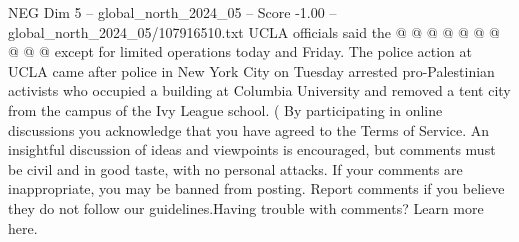 \begin{textsample}{NEG Dim 5 – global\_north\_2024\_05 – Score -1.00 – global\_north\_2024\_05/107916510.txt}
UCLA officials said the @ @ @ @ @ @ @ @ @ @ except for limited operations today and Friday.
The police action at UCLA came after police in New York City on Tuesday arrested pro-Palestinian activists who occupied a building at Columbia University and removed a tent city from the campus of the Ivy League school. ( By participating in online discussions you acknowledge that you have agreed to the Terms of Service.
An insightful discussion of ideas and viewpoints is encouraged, but comments must be civil and in good taste, with no personal attacks.
If your comments are inappropriate, you may be banned from posting.
Report comments if you believe they do not follow our guidelines.Having trouble with comments?
Learn more here.

\end{textsample}
